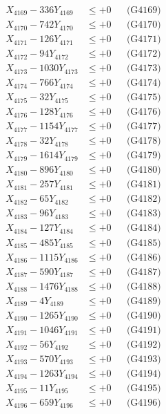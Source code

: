 \documentclass[a4paper,10pt]{article}
\begin{document}
{\begin{align}
X_{4169} - 336Y_{4169} &\leq +0 && \text{(G4169)} \\
X_{4170} - 742Y_{4170} &\leq +0 && \text{(G4170)} \\
\allowbreak
X_{4171} - 126Y_{4171} &\leq +0 && \text{(G4171)} \\
X_{4172} - 94Y_{4172} &\leq +0 && \text{(G4172)} \\
X_{4173} - 1030Y_{4173} &\leq +0 && \text{(G4173)} \\
X_{4174} - 766Y_{4174} &\leq +0 && \text{(G4174)} \\
X_{4175} - 32Y_{4175} &\leq +0 && \text{(G4175)} \\
X_{4176} - 128Y_{4176} &\leq +0 && \text{(G4176)} \\
X_{4177} - 1154Y_{4177} &\leq +0 && \text{(G4177)} \\
X_{4178} - 32Y_{4178} &\leq +0 && \text{(G4178)} \\
X_{4179} - 1614Y_{4179} &\leq +0 && \text{(G4179)} \\
X_{4180} - 896Y_{4180} &\leq +0 && \text{(G4180)} \\
\allowbreak
X_{4181} - 257Y_{4181} &\leq +0 && \text{(G4181)} \\
X_{4182} - 65Y_{4182} &\leq +0 && \text{(G4182)} \\
X_{4183} - 96Y_{4183} &\leq +0 && \text{(G4183)} \\
X_{4184} - 127Y_{4184} &\leq +0 && \text{(G4184)} \\
X_{4185} - 485Y_{4185} &\leq +0 && \text{(G4185)} \\
X_{4186} - 1115Y_{4186} &\leq +0 && \text{(G4186)} \\
X_{4187} - 590Y_{4187} &\leq +0 && \text{(G4187)} \\
X_{4188} - 1476Y_{4188} &\leq +0 && \text{(G4188)} \\
X_{4189} - 4Y_{4189} &\leq +0 && \text{(G4189)} \\
X_{4190} - 1265Y_{4190} &\leq +0 && \text{(G4190)} \\
\allowbreak
X_{4191} - 1046Y_{4191} &\leq +0 && \text{(G4191)} \\
X_{4192} - 56Y_{4192} &\leq +0 && \text{(G4192)} \\
X_{4193} - 570Y_{4193} &\leq +0 && \text{(G4193)} \\
X_{4194} - 1263Y_{4194} &\leq +0 && \text{(G4194)} \\
X_{4195} - 11Y_{4195} &\leq +0 && \text{(G4195)} \\
X_{4196} - 659Y_{4196} &\leq +0 && \text{(G4196)} \\

\end{align}}
\end{document}
